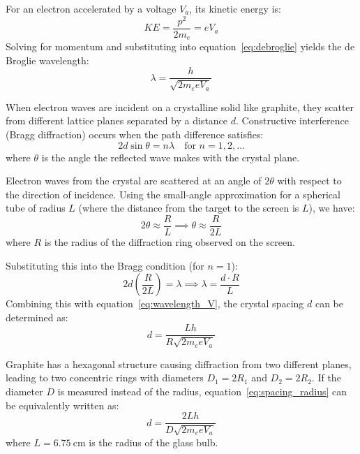 \documentclass[journal]{IEEEtran}
\begin{document}
For an electron accelerated by a voltage $V_a$, its kinetic energy is:
\begin{equation}
    KE = \frac{p^2}{2m_e} = e V_a
\end{equation}
Solving for momentum and substituting into equation~\eqref{eq:debroglie} yields the de Broglie wavelength:
\begin{equation}
    \lambda = \frac{h}{\sqrt{2m_e e V_a}}
    \label{eq:wavelength_V}
\end{equation}

When electron waves are incident on a crystalline solid like graphite, they scatter from different lattice planes separated by a distance $d$. Constructive interference (Bragg diffraction) occurs when the path difference satisfies:
\begin{equation}
    2d \sin\theta = n\lambda \quad \text{for } n = 1,2,\dots
    \label{eq:bragg}
\end{equation}
where $\theta$ is the angle the reflected wave makes with the crystal plane.

Electron waves from the crystal are scattered at an angle of $2\theta$ with respect to the direction of incidence. Using the small-angle approximation for a spherical tube of radius $L$ (where the distance from the target to the screen is $L$), we have:
\begin{equation}
    2\theta \approx \frac{R}{L} \implies \theta \approx \frac{R}{2L}
\end{equation}
where $R$ is the radius of the diffraction ring observed on the screen.

Substituting this into the Bragg condition (for $n=1$):
\begin{equation}
    2d \left( \frac{R}{2L} \right) = \lambda \implies \lambda = \frac{d \cdot R}{L}
\end{equation}
Combining this with equation~\eqref{eq:wavelength_V}, the crystal spacing $d$ can be determined as:
\begin{equation}
    d = \frac{L h}{R \sqrt{2m_e e V_a}}
    \label{eq:spacing_radius}
\end{equation}

Graphite has a hexagonal structure causing diffraction from two different planes, leading to two concentric rings with diameters $D_1 = 2R_1$ and $D_2 = 2R_2$. If the diameter $D$ is measured instead of the radius, equation~\eqref{eq:spacing_radius} can be equivalently written as:
\begin{equation}
    d = \frac{2 L h}{D \sqrt{2m_e e V_a}}
    \label{eq:spacing_diameter}
\end{equation}
where $L = \SI{6.75}{\centi\meter}$ is the radius of the glass bulb. 
\end{document}
